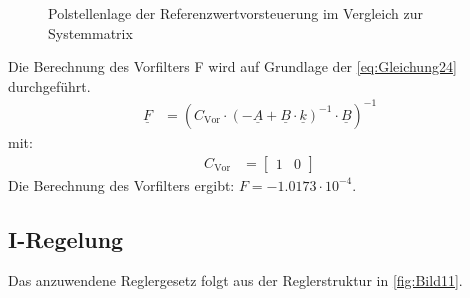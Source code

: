 \begin{figure}[H]
   \centering
   \caption[Polstellenlage der Referenzwertvorsteuerung]{Polstellenlage der Referenzwertvorsteuerung im Vergleich zur Systemmatrix}
   \label{fig:Bild10}
\end{figure}

Die Berechnung des Vorfilters F wird auf Grundlage der \autoref{eq:Gleichung24} durchgeführt.
\begin{align}
    \underline{F} &= \left(C_{\mathrm{Vor}}\cdot\left(-\underline{A}+\underline{B}\cdot\underline{k}\right)^{-1}\cdot\underline{B}\right)^{-1}
    \label{eq:Gleichung24}
\end{align}
\newline
mit:
\begin{align*}
    C_{\mathrm{Vor}} &= 
    \begin{bmatrix}
        1 & 0
    \end{bmatrix}
\end{align*}
\newline
Die Berechnung des Vorfilters ergibt: $F = -1.0173\cdot 10^{-4}$.

\clearpage

\subsection{I-Regelung} \label{sec:Iregler}

Das anzuwendene Reglergesetz folgt aus der Reglerstruktur in \autoref{fig:Bild11}.

